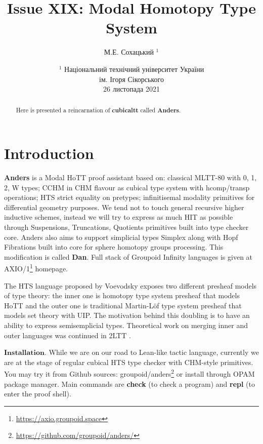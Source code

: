\documentclass{article}
\theoremstyle{definition}
\begin{document}
\author { М.Е. Сохацький $^1$ }
\title { Issue XIX: Modal Homotopy Type System }
\date{ \small $^1$ Національний технічний університет України \\
       ім. Ігоря Сікорського \\
       26 листопада 2021 }
\maketitle

\begin{abstract}
Here is presented a reincarnation of \textbf{cubicaltt} called \textbf{Anders}.
\end{abstract}

\newpage
\tableofcontents
\newpage

\section{Introduction}

\textbf{Anders} is a Modal HoTT proof assistant based on: classical MLTT-80 \cite{MLTT80}
with 0, 1, 2, W types; CCHM \cite{CCHM} in CHM \cite{CHM} flavour as cubical type system with
hcomp/transp operations; HTS \cite{HTS} strict equality on pretypes;
infinitisemal \cite{deRham} modality primitives for differential geometry purposes.
We tend not to touch general recursive higher inductive schemes,
instead we will try to express as much HIT as possible through Suspensions, Truncations,
Quotients primitives built into type checker core.
Anders also aims to support simplicial types Simplex along with Hopf Fibrations
built into core for sphere homotopy groups processing. This modification is called \textbf{Dan}.
Full stack of Groupoid Infinity languages is given at AXIO/1\footnote{\url{https://axio.groupoid.space}} homepage.

The HTS language proposed by Voevodsky exposes two different presheaf models of type theory:
the inner one is homotopy type system presheaf that models HoTT and the outer one is
traditional Martin-Löf type system presheaf that models set theory with UIP.
The motivation behind this doubling is to have an ability to express semisemplicial types.
Theoretical work on merging inner and outer languages was continued in 2LTT \cite{2LTT}.

$\mathbf{Installation}$. While we are on our road to Lean-like tactic language, currently we are at the stage of
regular cubical HTS type checker with CHM-style primitives. You may try it from Github
sources: groupoid/anders\footnote{\url{https://github.com/groupoid/anders/}} or install
through OPAM package manager. Main commands are \textbf{check} (to check a program)
and \textbf{repl} (to enter the proof shell).
\end{document}
